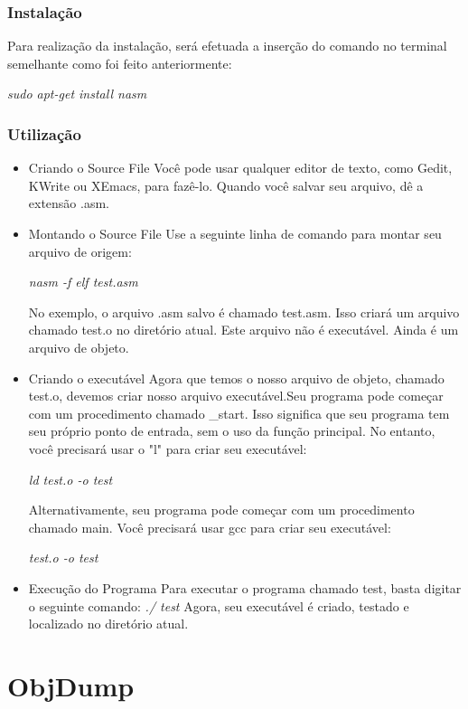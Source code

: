 \documentclass[12pt]{article}
\begin{document}
\subsubsection{Instalação}

Para realização da instalação, será efetuada a inserção do comando no terminal semelhante como foi feito anteriormente:

\textit{sudo apt-get install nasm}\\

\subsubsection{Utilização}

\begin{itemize}
\item Criando o Source File
	\subitem Você pode usar qualquer editor de texto, como Gedit, KWrite ou XEmacs, para fazê-lo. Quando você salvar seu arquivo, dê a extensão .asm.
\item Montando o Source File
	\subitem Use a seguinte linha de comando para montar seu arquivo de origem:
    
		\textit{nasm -f elf test.asm}
    
    No exemplo, o arquivo .asm salvo é chamado test.asm. Isso criará um arquivo chamado test.o no diretório atual. Este arquivo não é executável. Ainda é um arquivo de objeto.
\item Criando o executável
	\subitem Agora que temos o nosso arquivo de objeto, chamado test.o, devemos criar nosso arquivo executável.Seu programa pode começar com um procedimento chamado _start. Isso significa que seu programa tem seu próprio ponto de entrada, sem o uso da função principal. No entanto, você precisará usar o "l" para criar seu executável:
    
    	\textit{ld test.o -o test}
    
    Alternativamente, seu programa pode começar com um procedimento chamado main. Você precisará usar gcc para criar seu executável:

		\textit{test.o -o test} 
\item Execução do Programa
	\subitem Para executar o programa chamado test, basta digitar o seguinte comando:
    \textit{./ test}
Agora, seu executável é criado, testado e localizado no diretório atual.
\end{itemize}

\section{ObjDump}
\end{document}
